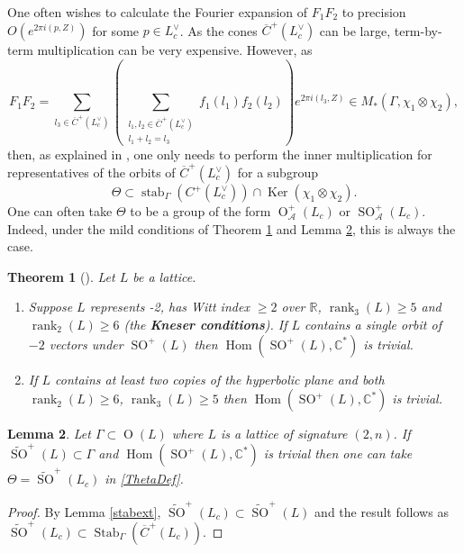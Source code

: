 \documentclass[12pt, a4paper]{article}
\newtheorem{theorem}{Theorem}[section]
\newtheorem{lemma}[theorem]{Lemma}
\newcommand{\RR}{\mathbb{R}}
\newcommand{\CC}{\mathbb{C}}
\newcommand{\beq}{\begin{equation*}}
\newcommand{\eeq}{\end{equation*}}
\newcommand{\Ac}{\mathcal{A}}
\newcommand{\opn}{\operatorname}
\begin{document}
One often wishes to calculate the Fourier expansion of $F_1 F_2$ to precision $O(e^{2 \pi i(p, Z)})$ for some $p \in L_c^{\vee}$.
As the cones $\overline{C}^+(L_c^{\vee})$ can be large, term-by-term multiplication can be very expensive.
However, as  
\beq
F_1 F_2 =
 \sum_{l_3 \in \overline{C}^+(L_c^{\vee})} \left (  \sum_{\substack{l_1, l_2 \in \overline{C}^+(L_c^{\vee}) \\ l_1 + l_2 = l_3}} f_1(l_1) f_2(l_2) \right )e^{2 \pi i (l_3, Z)} \in M_*(\Gamma, \chi_1 \otimes \chi_2),
\eeq
then, as explained in \cite{RaumImplement}, one only needs to perform the inner multiplication for representatives of the orbits of $\overline{C}^+(L_c^{\vee})$ for a subgroup
\begin{equation}\label{ThetaDef}
\Theta \subset  \opn{stab}_{\Gamma}(C^+(L_c^{\vee})) \cap \opn{Ker}(\chi_1 \otimes \chi_2).
\end{equation}
One can often take $\Theta$ to be a group of the form $\opn{O}^+_{\Ac}(L_c)$ or $\opn{SO}^+_{\Ac}(L_c)$. 
Indeed, under the mild conditions of Theorem \ref{abelianisationthm} and Lemma \ref{thetalemma}, this is always the case. 
\begin{theorem}[\hspace{1sp}\cite{abelianisation}]\label{abelianisationthm}
  Let $L$ be a lattice.
  \begin{enumerate}
\item  Suppose $L$
  represents -2,
  has Witt index $\geq 2$ over $\RR$,
  $\opn{rank}_3(L) \geq 5$ and
  $\opn{rank}_2(L) \geq 6$
  (the \textbf{Kneser conditions}).
  If $L$ contains a single orbit of $-2$ vectors under $\opn{SO}^+(L)$ then $\opn{Hom}(\opn{SO}^+(L), \CC^*)$ is trivial.
\item If $L$ contains at least two copies of the hyperbolic plane and both $\opn{rank}_2(L) \geq 6$, $\opn{rank}_3(L) \geq 5$ then $\opn{Hom}(\opn{SO}^+(L), \CC^*)$ is trivial.
\end{enumerate}
\end{theorem}
\begin{lemma}\label{thetalemma}
  Let $\Gamma \subset \opn{O}(L)$ where $L$ is a lattice of signature $(2,n)$. 
  If $\widetilde{\opn{SO}}^+(L) \subset \Gamma$ and $\opn{Hom}(\opn{SO}^+(L), \CC^*)$ is trivial then one can take $\Theta=\widetilde{\opn{SO}}^+(L_c)$ in \eqref{ThetaDef}. 
\end{lemma}
\begin{proof}
  By Lemma \ref{stabext}, $\widetilde{\opn{SO}}^+(L_c) \subset \widetilde{\opn{SO}}^+(L)$ and the result follows as $\widetilde{\opn{SO}}^+(L_c) \subset \opn{Stab}_{\Gamma}(\overline{C}^+(L_c))$. 
\end{proof}
\end{document}
